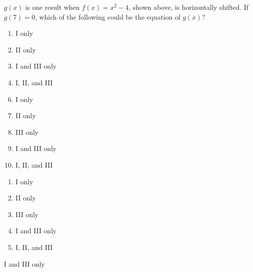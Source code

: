 
$g(x)$ is one result when $f(x)=x^{2}-4$, shown above, is horizontally shifted.  If $g(7)=0$,
which of the following could be the equation of $g(x)$?




\ifsat
	\begin{enumerate}[label=\Alph*)]
		\item I only
		\item II only
		\item I and III only%
		\item I, II, and III
	\end{enumerate}
\else
\fi

\ifacteven
	\begin{enumerate}[label=\textbf{\Alph*.},itemsep=\fill,align=left]
		\setcounter{enumii}{5}
		\item I only
		\item II only
		\item III only
		\addtocounter{enumii}{1}
		\item I and III only%
		\item I, II, and III
	\end{enumerate}
\else
\fi

\ifactodd
	\begin{enumerate}[label=\textbf{\Alph*.},itemsep=\fill,align=left]
		\item I only
		\item II only
		\item III only
		\item I and III only%
		\item I, II, and III
	\end{enumerate}
\else
\fi

\ifgridin
 I and III only%
		
\else
\fi

